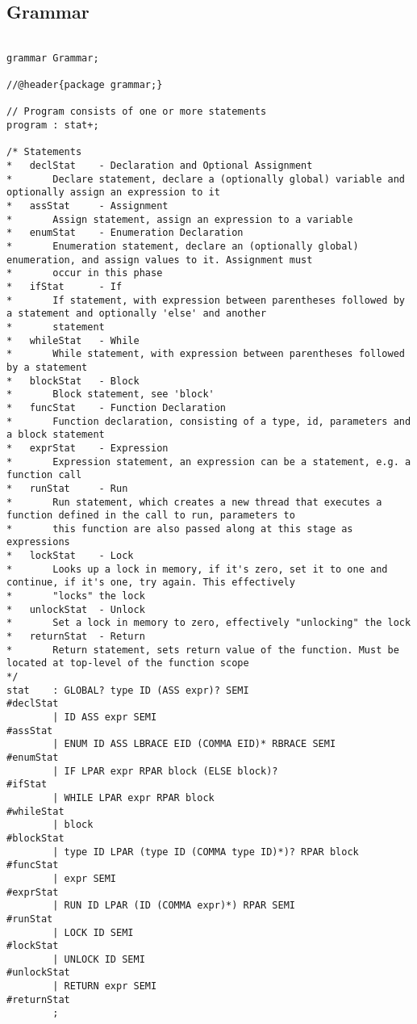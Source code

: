\documentclass[10pt,a4paper]{report}
\begin{document}
\begin{appendices}

\chapter{Grammar}

\begin{verbatim}

grammar Grammar;

//@header{package grammar;}

// Program consists of one or more statements
program	: stat+;

/* Statements
* 	declStat	- Declaration and Optional Assignment
*		Declare statement, declare a (optionally global) variable and optionally assign an expression to it
*	assStat		- Assignment
*		Assign statement, assign an expression to a variable
*	enumStat	- Enumeration Declaration
*		Enumeration statement, declare an (optionally global) enumeration, and assign values to it. Assignment must
*		occur in this phase
*	ifStat		- If
*		If statement, with expression between parentheses followed by a statement and optionally 'else' and another
*		statement
*	whileStat	- While
*		While statement, with expression between parentheses followed by a statement
*	blockStat	- Block
*		Block statement, see 'block'
*	funcStat	- Function Declaration
*		Function declaration, consisting of a type, id, parameters and a block statement
*	exprStat	- Expression
*		Expression statement, an expression can be a statement, e.g. a function call
*	runStat		- Run
*		Run statement, which creates a new thread that executes a function defined in the call to run, parameters to
*		this function are also passed along at this stage as expressions
*	lockStat	- Lock
*		Looks up a lock in memory, if it's zero, set it to one and continue, if it's one, try again. This effectively
*		"locks" the lock
*	unlockStat	- Unlock
*		Set a lock in memory to zero, effectively "unlocking" the lock
*	returnStat	- Return
*		Return statement, sets return value of the function. Must be located at top-level of the function scope
*/
stat	: GLOBAL? type ID (ASS expr)? SEMI							#declStat
		| ID ASS expr SEMI 											#assStat
		| ENUM ID ASS LBRACE EID (COMMA EID)* RBRACE SEMI			#enumStat
		| IF LPAR expr RPAR block (ELSE block)?						#ifStat
		| WHILE LPAR expr RPAR block								#whileStat
		| block														#blockStat
		| type ID LPAR (type ID (COMMA type ID)*)? RPAR block		#funcStat
		| expr SEMI													#exprStat
		| RUN ID LPAR (ID (COMMA expr)*) RPAR SEMI					#runStat
		| LOCK ID SEMI												#lockStat
		| UNLOCK ID SEMI											#unlockStat
		| RETURN expr SEMI											#returnStat
		;


\end{verbatim}
\end{appendices}
\end{document}
